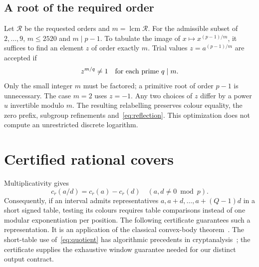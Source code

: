 \documentclass[11pt]{article}
\theoremstyle{definition}\newtheorem{remark}[theorem]{Remark}
\newcommand{\cl}{c_r}
\begin{document}
\subsection{A root of the required order}
Let $\mathcal R$ be the requested orders and $m=\operatorname{lcm}\mathcal R$.
For the admissible subset of $2,\ldots,9$, $m\le2520$ and $m\mid p-1$.
To tabulate the image of $x\mapsto x^{(p-1)/m}$, it suffices to find an
element $z$ of order exactly $m$. Trial values
$z=a^{(p-1)/m}$ are accepted if
\[
 z^{m/q}\ne1\quad\hbox{for each prime }q\mid m.
\]
Only the small integer $m$ must be factored; a primitive root of order $p-1$
is unnecessary. The case $m=2$ uses $z=-1$. Any two choices of $z$ differ by
a power $u$ invertible modulo $m$. The resulting relabelling preserves
colour equality, the zero prefix, subgroup refinements and~\eqref{eq:reflection}.
This optimization does not compute an unrestricted discrete logarithm.

\section{Certified rational covers}\label{sec:cover}
Multiplicativity gives
\begin{equation}\label{eq:quotient}
 \cl(a/d)=\cl(a)-\cl(d)
 \quad(a,d\ne0\bmod p).
\end{equation}
Consequently, if an interval admits representatives
$a,a+d,\ldots,a+(Q-1)d$ in a short signed table, testing its colours requires
table comparisons instead of one modular exponentiation per position.
The following certificate guarantees such a representation. It is an
application of the classical convex-body theorem~\cite{minkowski}.
The short-table use of~\eqref{eq:quotient} has algorithmic precedents in
cryptanalysis~\cite{beullens,kkk}; the certificate supplies the exhaustive
window guarantee needed for our distinct output contract.
\end{document}

